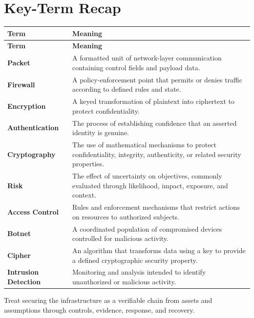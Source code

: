 \documentclass[11pt]{article}
\begin{document}
\section*{Key-Term Recap}
\begin{longtable}{>{\RaggedRight\arraybackslash}p{}>{\RaggedRight\arraybackslash}p{}}
\toprule\rowcolor{Navy}\color{white}\textbf{Term} & \color{white}\textbf{Meaning}\\\midrule
\endfirsthead
\toprule\rowcolor{Navy}\color{white}\textbf{Term} & \color{white}\textbf{Meaning}\\\midrule
\endhead
\textbf{Packet} & A formatted unit of network-layer communication containing control fields and payload data. \\\midrule
\textbf{Firewall} & A policy-enforcement point that permits or denies traffic according to defined rules and state. \\\midrule
\textbf{Encryption} & A keyed transformation of plaintext into ciphertext to protect confidentiality. \\\midrule
\textbf{Authentication} & The process of establishing confidence that an asserted identity is genuine. \\\midrule
\textbf{Cryptography} & The use of mathematical mechanisms to protect confidentiality, integrity, authenticity, or related security properties. \\\midrule
\textbf{Risk} & The effect of uncertainty on objectives, commonly evaluated through likelihood, impact, exposure, and context. \\\midrule
\textbf{Access Control} & Rules and enforcement mechanisms that restrict actions on resources to authorized subjects. \\\midrule
\textbf{Botnet} & A coordinated population of compromised devices controlled for malicious activity. \\\midrule
\textbf{Cipher} & An algorithm that transforms data using a key to provide a defined cryptographic security property. \\\midrule
\textbf{Intrusion Detection} & Monitoring and analysis intended to identify unauthorized or malicious activity. \\\midrule
\bottomrule
\end{longtable}
\begin{takeawaybox}
Treat securing the infrastructure as a verifiable chain from assets and assumptions through controls, evidence, response, and recovery.
\end{takeawaybox}
\end{document}
